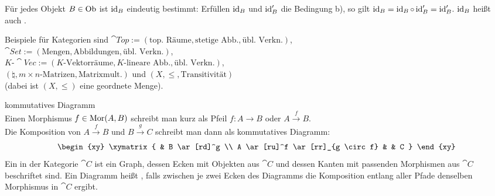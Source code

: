 \begin{Bem}
    Für jedes Objekt $B \in \text{Ob}$ ist $\operatorname{id}_B$ eindeutig bestimmt:
    Erfüllen $\operatorname{id}_B$ und $\operatorname{id}_B'$ die Bedingung b), so gilt
    $\operatorname{id}_B = \operatorname{id}_B \circ \operatorname{id}_B' = \operatorname{id}_B'$.
    $\operatorname{id}_B$ heißt auch .
\end{Bem}

\begin{Bsp}
    Beispiele für Kategorien sind
    $\cat{Top} := (\text{top. Räume}, \text{stetige Abb.},
    \text{übl. Verkn.})$, \\
    $\cat{Set} := (\text{Mengen}, \text{Abbildungen},
    \text{übl. Verkn.})$, \\
    $K\text{-}\cat{Vec} := (K\text{-Vektorräume}, K\text{-lineare Abb.},
    \text{übl. Verkn.})$, \\
    $(\natural, m \times n\text{-Matrizen}, \text{Matrixmult.})$ und
    $(X, \le, \text{Transitivität})$ \\
    (dabei ist $(X, \le)$ eine geordnete Menge).
\end{Bsp}

\linie

\begin{Def}{kommutatives Diagramm}\\
    Einen Morphismus $f \in \text{Mor}(A, B)$ schreibt man kurz als Pfeil
    $f\colon A \rightarrow B$ oder $A \xrightarrow{f} B$. \\
    Die Komposition von $A \xrightarrow{f} B$ und $B \xrightarrow{g} C$
    schreibt man dann als kommutatives Diagramm:
    \displaymathother
    \begin{align*}
        \begin{xy}
            \xymatrix{
                & B \ar[rd]^g \\
                A \ar[ru]^f \ar[rr]_{g \circ f} & & C
            }
        \end{xy}
    \end{align*}
    \displaymathnormal
    Ein  in der Kategorie $\cat{C}$ ist ein Graph, dessen
    Ecken mit Objekten aus $\cat{C}$ und dessen Kanten mit passenden
    Morphismen aus $\cat{C}$ beschriftet sind.
    Ein Diagramm heißt , falls zwischen je zwei Ecken des
    Diagramms die Komposition entlang aller Pfade denselben Morphismus
    in $\cat{C}$ ergibt.
\end{Def}

